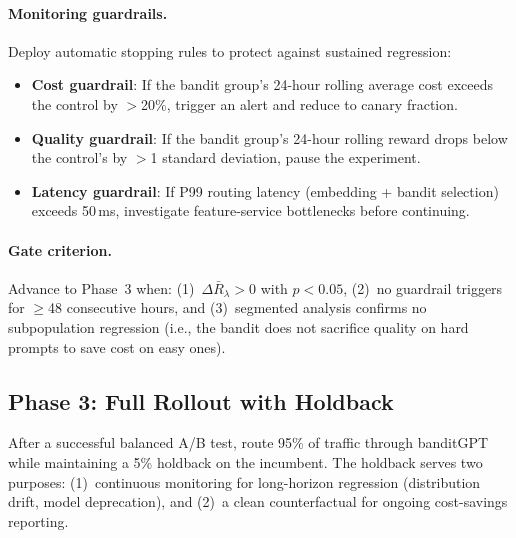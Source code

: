 \paragraph{Monitoring guardrails.}
Deploy automatic stopping rules to protect against sustained regression:
\begin{itemize}[nosep,leftmargin=*]
    \item \textbf{Cost guardrail}: If the bandit group's 24-hour rolling average cost exceeds the control by $>$20\%, trigger an alert and reduce to canary fraction.
    \item \textbf{Quality guardrail}: If the bandit group's 24-hour rolling reward drops below the control's by $>$1 standard deviation, pause the experiment.
    \item \textbf{Latency guardrail}: If P99 routing latency (embedding + bandit selection) exceeds 50\,ms, investigate feature-service bottlenecks before continuing.
\end{itemize}

\paragraph{Gate criterion.}
Advance to Phase~3 when: (1)~$\Delta \bar{R}_\lambda > 0$ with $p < 0.05$, (2)~no guardrail triggers for $\geq$48 consecutive hours, and (3)~segmented analysis confirms no subpopulation regression (i.e., the bandit does not sacrifice quality on hard prompts to save cost on easy ones).


\subsection{Phase 3: Full Rollout with Holdback}
\label{app:ab_rollout}

After a successful balanced A/B test, route 95\% of traffic through banditGPT while maintaining a 5\% holdback on the incumbent.
The holdback serves two purposes: (1)~continuous monitoring for long-horizon regression (distribution drift, model deprecation), and (2)~a clean counterfactual for ongoing cost-savings reporting.

